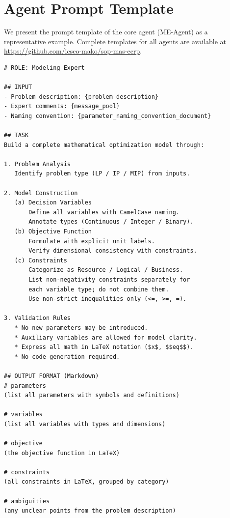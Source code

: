 \documentclass[preprint,12pt]{elsarticle}
\begin{document}
\clearpage
\appendix
\section{Agent Prompt Template}\label{app1}
We present the prompt template of the core agent (ME-Agent) as a representative example. Complete templates for all agents are available at \url{https://github.com/icsco-mako/sop-mas-ecrp}.

\begin{nolinenumbers}
\begin{promptbox}
\begin{lstlisting}[style=prompttemplate]
# ROLE: Modeling Expert

## INPUT
- Problem description: {problem_description}
- Expert comments: {message_pool}
- Naming convention: {parameter_naming_convention_document}

## TASK
Build a complete mathematical optimization model through:

1. Problem Analysis
   Identify problem type (LP / IP / MIP) from inputs.

2. Model Construction
   (a) Decision Variables
       Define all variables with CamelCase naming.
       Annotate types (Continuous / Integer / Binary).
   (b) Objective Function
       Formulate with explicit unit labels.
       Verify dimensional consistency with constraints.
   (c) Constraints
       Categorize as Resource / Logical / Business.
       List non-negativity constraints separately for
       each variable type; do not combine them.
       Use non-strict inequalities only (<=, >=, =).

3. Validation Rules
   * No new parameters may be introduced.
   * Auxiliary variables are allowed for model clarity.
   * Express all math in LaTeX notation ($x$, $$eq$$).
   * No code generation required.

## OUTPUT FORMAT (Markdown)
# parameters
(list all parameters with symbols and definitions)

# variables
(list all variables with types and dimensions)

# objective
(the objective function in LaTeX)

# constraints
(all constraints in LaTeX, grouped by category)

# ambiguities
(any unclear points from the problem description)
\end{lstlisting}
\end{promptbox}
\label{lst:me-agent-prompt}
\end{nolinenumbers}
\end{document}
